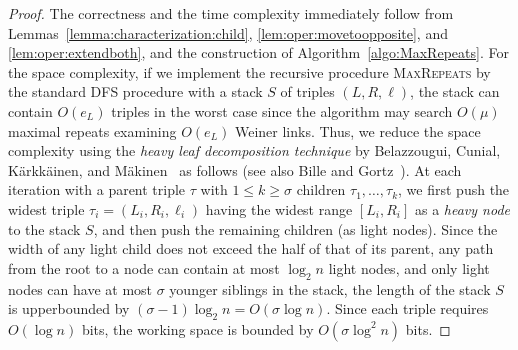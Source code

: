 \begin{proof}
The correctness and the time complexity immediately follow from Lemmas~\ref{lemma:characterization:child}, \ref{lem:oper:movetoopposite}, and \ref{lem:oper:extendboth}, and the construction of Algorithm~\ref{algo:MaxRepeats}. 
For the space complexity, if we implement the recursive procedure \textsc{MaxRepeats} by the standard DFS procedure with a stack $S$ of triples $(L, R, \ell)$, the stack can contain $O(e_L)$ triples in the worst case since the algorithm may search $O(\mu)$ maximal repeats examining $O(e_L)$ Weiner links. Thus, we reduce the space complexity using the \textit{heavy leaf decomposition technique} by Belazzougui, Cunial, K{\"{a}}rkk{\"{a}}inen, and M{\"{a}}kinen~\cite{belazzougui2020linear} as follows (see also Bille and Gortz~\cite{bille:gort:TALG:2011:treeinclusion}). At each iteration with a parent triple $\tau$ with $1\le k\ge \sigma$ children $\tau_1, \dots, \tau_k$, we first push the widest triple $\tau_i = (L_i, R_i, \ell_i)$ having the widest range $[L_i,R_i]$ as a \textit{heavy node} to the stack $S$, and then push the remaining children (as light nodes). Since the width of any light child does not exceed the half of that of its parent, any path from the root to a node can contain at most $\log_2 n$ light nodes, and only light nodes can have at most $\sigma$ younger siblings in the stack, the length of the stack $S$ is upperbounded by $(\sigma-1)\log_2 n = O(\sigma\log n)$. Since each triple requires $O(\log n)$ bits, the working space is bounded by $O(\sigma\log^2 n)$ bits.
\end{proof}




